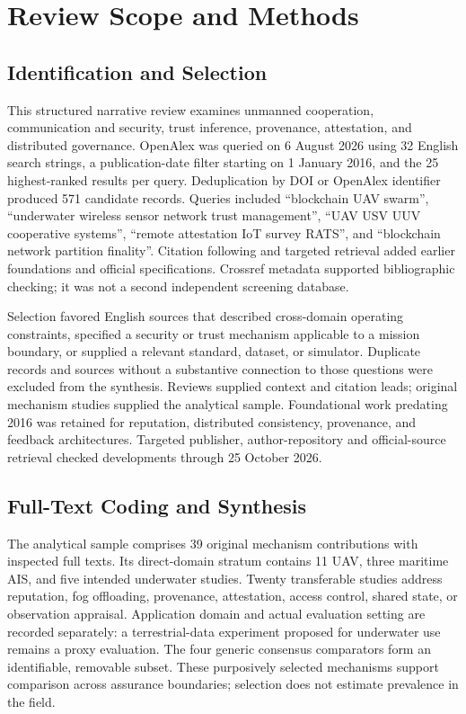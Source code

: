 \section{Review Scope and Methods}\label{sec:scope}

\subsection{Identification and Selection}

This structured narrative review examines unmanned cooperation, communication and security, trust inference, provenance, attestation, and distributed governance. OpenAlex was queried on 6 August 2026 using 32 English search strings, a publication-date filter starting on 1 January 2016, and the 25 highest-ranked results per query. Deduplication by DOI or OpenAlex identifier produced 571 candidate records. Queries included ``blockchain UAV swarm'', ``underwater wireless sensor network trust management'', ``UAV USV UUV cooperative systems'', ``remote attestation IoT survey RATS'', and ``blockchain network partition finality''. Citation following and targeted retrieval added earlier foundations and official specifications. Crossref metadata supported bibliographic checking; it was not a second independent screening database.

Selection favored English sources that described cross-domain operating constraints, specified a security or trust mechanism applicable to a mission boundary, or supplied a relevant standard, dataset, or simulator. Duplicate records and sources without a substantive connection to those questions were excluded from the synthesis. Reviews supplied context and citation leads; original mechanism studies supplied the analytical sample. Foundational work predating 2016 was retained for reputation, distributed consistency, provenance, and feedback architectures. Targeted publisher, author-repository and official-source retrieval checked developments through 25 October 2026.

\subsection{Full-Text Coding and Synthesis}\label{sec:coding}

The analytical sample comprises 39 original mechanism contributions with inspected full texts. Its direct-domain stratum contains 11 UAV, three maritime AIS, and five intended underwater studies. Twenty transferable studies address reputation, fog offloading, provenance, attestation, access control, shared state, or observation appraisal. Application domain and actual evaluation setting are recorded separately: a terrestrial-data experiment proposed for underwater use remains a proxy evaluation. The four generic consensus comparators form an identifiable, removable subset. These purposively selected mechanisms support comparison across assurance boundaries; selection does not estimate prevalence in the field.

